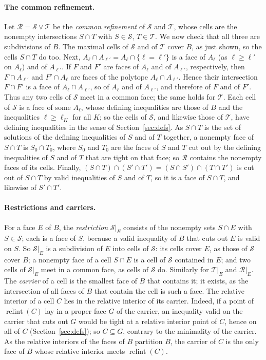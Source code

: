 \documentclass[11pt]{article}
\theoremstyle{definition}
\theoremstyle{remark}
\newcommand{\SSS}{\mathcal S}
\newcommand{\TT}{\mathcal T}
\newcommand{\RR}{\mathcal R}
\newcommand{\relint}{\operatorname{relint}}
\begin{document}
\paragraph{The common refinement.}
Let $\RR=\SSS\vee\TT$ be the \emph{common refinement} of $\SSS$ and $\TT$, whose
cells are the nonempty intersections $S\cap T$ with $S\in\SSS$,
$T\in\TT$. We now check that all three are subdivisions of $B$. The maximal cells of $\SSS$ and of $\TT$ cover $B$, as just
shown, so the cells $S\cap T$ do too. Next, $A_\ell\cap A_{\ell'}=A_\ell\cap\{\ell=\ell'\}$ is a face of
$A_\ell$ (as $\ell\geq\ell'$ on $A_\ell$) and of $A_{\ell'}$. If $F$ and $F'$ are faces of $A_\ell$ and of $A_{\ell'}$, respectively, then
$F\cap A_{\ell'}$ and $F'\cap A_\ell$ are faces of the polytope $A_\ell\cap A_{\ell'}$. Hence their intersection $F\cap F'$ is a face of $A_\ell\cap A_{\ell'}$, so of $A_\ell$ and of $A_{\ell'}$, and therefore of $F$ and of $F'$. Thus any two cells of $\SSS$ meet in a common face; the same holds for $\TT$. Each cell of $\SSS$ is a face of some $A_\ell$, whose defining inequalities are those of $B$ and the inequalities $\ell\geq\ell_K$ for all $K$; so the cells of $\SSS$, and likewise those of $\TT$, have defining inequalities in the sense of Section~\ref{sec:defs}. As $S\cap T$ is the set of solutions of the defining inequalities of $S$ and of $T$ together, a nonempty face of $S\cap T$ is $S_0\cap T_0$, where $S_0$ and $T_0$ are the faces of $S$ and $T$ cut out by the defining inequalities of $S$ and of $T$ that are tight on that face; so $\RR$ contains the nonempty faces of its cells. Finally,
$(S\cap T)\cap(S'\cap T')=(S\cap S')\cap(T\cap T')$ is cut out of $S\cap T$ by valid inequalities of
$S$ and of $T$, so it is a face of $S\cap T$, and likewise of $S'\cap T'$.

\paragraph{Restrictions and carriers.}
For a face $E$ of $B$, the \emph{restriction} $\SSS|_E$ consists of the
nonempty sets $S\cap E$ with $S\in\SSS$; each is a face of $S$, because a valid inequality of $B$ that cuts out $E$ is valid on $S$. So $\SSS|_E$ is a subdivision of $E$ into cells of $\SSS$: its cells cover $E$, as those of $\SSS$ cover $B$; a nonempty face of a cell $S\cap E$ is a cell of $\SSS$ contained in $E$; and two cells of $\SSS|_E$ meet in a common face, as cells of $\SSS$ do. Similarly for $\TT|_E$
and $\RR|_E$. The \emph{carrier} of a cell is the smallest face of $B$ that contains it; it exists, as the intersection of all faces of $B$ that contain the cell is such a face. The relative interior of a cell $C$ lies in the relative interior of its carrier. Indeed, if a point of $\relint(C)$ lay in a proper face $G$ of the carrier, an inequality valid on the carrier that cuts out $G$ would be tight at a relative interior point of $C$, hence on all of $C$ (Section~\ref{sec:defs}); so $C\subseteq G$, contrary to the minimality of the carrier. As the
relative interiors of the faces of $B$ partition $B$, the carrier of $C$ is the only face of $B$ whose
relative interior meets $\relint(C)$.
\end{document}
